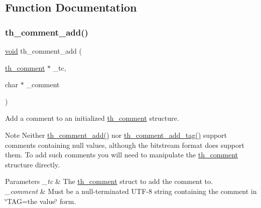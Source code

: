 \subsection{Function Documentation}
\mbox{\label{group__basefuncs_ga19a1f7b8032db957df151a34e5ac9272}} 
\subsubsection{\texorpdfstring{th\+\_\+comment\+\_\+add()}{th\_comment\_add()}}
{\footnotesize\ttfamily \hyperlink{png_8h_ac9c84fa68bbad002983e35ce3663c686}{void} th\+\_\+comment\+\_\+add (\begin{DoxyParamCaption}\item[{\hyperlink{structth__comment}{th\+\_\+comment} $\ast$}]{\+\_\+tc,  }\item[{char $\ast$}]{\+\_\+comment }\end{DoxyParamCaption})}

Add a comment to an initialized \hyperlink{structth__comment}{th\+\_\+comment} structure. \begin{DoxyNote}{Note}
Neither \hyperlink{group__basefuncs_ga19a1f7b8032db957df151a34e5ac9272}{th\+\_\+comment\+\_\+add()} nor \hyperlink{group__basefuncs_ga6c5edc201ca220a30787ca6c1ddcaeaf}{th\+\_\+comment\+\_\+add\+\_\+tag()} support comments containing null values, although the bitstream format does support them. To add such comments you will need to manipulate the \hyperlink{structth__comment}{th\+\_\+comment} structure directly. 
\end{DoxyNote}

\begin{DoxyParams}{Parameters}
{\em \+\_\+tc} & The \hyperlink{structth__comment}{th\+\_\+comment} struct to add the comment to. \\
\hline
{\em \+\_\+comment} & Must be a null-\/terminated U\+T\+F-\/8 string containing the comment in \char`\"{}\+T\+A\+G=the value\char`\"{} form. \\
\hline
\end{DoxyParams}
\mbox{\label{group__basefuncs_ga6c5edc201ca220a30787ca6c1ddcaeaf}} 
